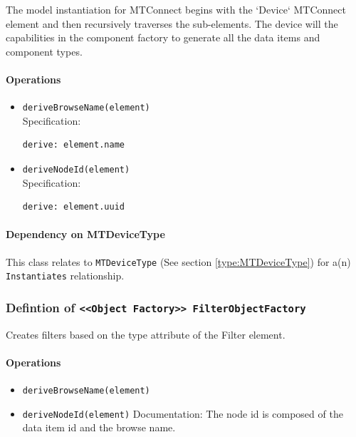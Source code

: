 The model instantiation for MTConnect begins with the `Device` MTConnect element and then recursively traverses the sub-elements. The device will the capabilities in the component factory to generate all the data items and component types. 

\paragraph{Operations}
\begin{itemize}
  \item \texttt{deriveBrowseName(element)}\\
    Specification:
   \indent \begin{lstlisting}
derive: element.name
\end{lstlisting}

  \item \texttt{deriveNodeId(element)}\\
    Specification:
   \indent \begin{lstlisting}
derive: element.uuid
\end{lstlisting}

\end{itemize}
\paragraph{Dependency on MTDeviceType}

This class relates to \texttt{MTDeviceType} (See section \ref{type:MTDeviceType}) for a(n) \texttt{Instantiates} relationship.

\FloatBarrier
\subsubsection{Defintion of \texttt{<<Object Factory>> FilterObjectFactory}} \label{type:FilterObjectFactory}

\FloatBarrier

Creates filters based on the type attribute of the Filter element. 

\paragraph{Operations}
\begin{itemize}
  \item \texttt{deriveBrowseName(element)}
  \item \texttt{deriveNodeId(element)}
    Documentation: The node id is composed of the data item id and the browse name.

\end{itemize}
